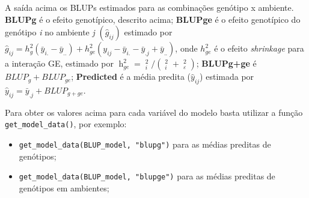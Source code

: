 \documentclass[
]{book}
\newenvironment{Shaded}{\begin{snugshade}}{\end{snugshade}}
\newcommand{\CommentTok}[1]{\textcolor[rgb]{0.56,0.35,0.01}{\textit{#1}}}
\newcommand{\KeywordTok}[1]{\textcolor[rgb]{0.13,0.29,0.53}{\textbf{#1}}}
\newcommand{\NormalTok}[1]{#1}
\newcommand{\OperatorTok}[1]{\textcolor[rgb]{0.81,0.36,0.00}{\textbf{#1}}}
\providecommand{\tightlist}{%
  \setlength{\itemsep}{0pt}\setlength{\parskip}{0pt}}
\numberwithin{equation}{section}
\newcommand{\indt}[1]{\index{#1|ST}}
\begin{document}
\begin{Shaded}
\end{Shaded}

A saída acima os BLUPs \indt{BLUP} estimados para as combinações genótipo x ambiente. \textbf{BLUPg} é o efeito genotípico, descrito acima; \textbf{BLUPge} é o efeito genotípico do genótipo \emph{i} no ambiente \emph{j} \((\hat{g}_{ij})\) estimado por \(\hat{g}_{ij} = h_g^2(\bar{y}_{i.}-\bar{y}_{..})+h_{ge}^2(y_{ij}-\bar{y}_{i.}-\bar{y}_{.j}+\bar{y}_{..})\), onde \(h_{ge}^2\) é o efeito \emph{shrinkage} para a interação GE, estimado por \(\mathop h\nolimits_{ge}^2 = \mathop {\hat \sigma }\nolimits_i^2 /(\mathop {\hat \sigma }\nolimits_i^2 + \mathop {\hat \sigma }\nolimits_\varepsilon ^2)\); \textbf{BLUPg+ge} é \(BLUP_g+BLUP_{ge}\); \textbf{Predicted} é a média predita (\(\hat{y}_{ij}\)) estimada por \(\hat{y}_{ij} = \bar{y}_{.j}+BLUP_{g+ge}\).

Para obter os valores acima para cada variável do modelo basta utilizar a função \texttt{get\_model\_data()}, por exemplo:

\begin{itemize}
\tightlist
\item
  \texttt{get\_model\_data(BLUP\_model,\ "blupg")} para as médias preditas de genótipos;
\item
  \texttt{get\_model\_data(BLUP\_model,\ "blupge")} para as médias preditas de genótipos em ambientes;
\end{itemize}
\end{document}
